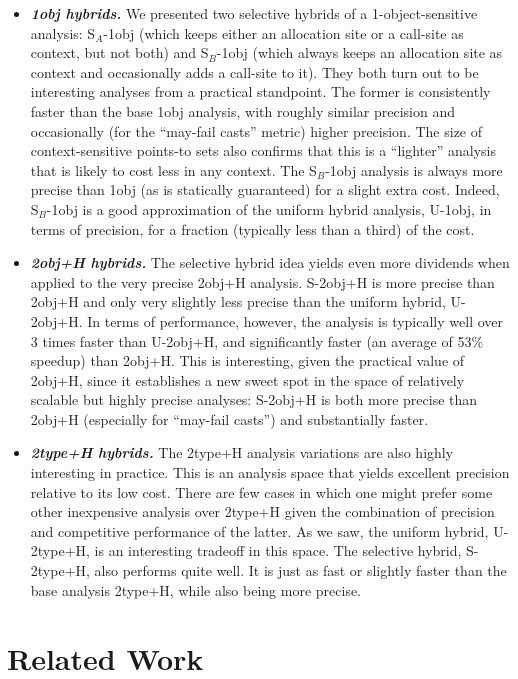 \begin{itemize}
\item \textbf{\emph{1obj hybrids.}}
We presented two selective hybrids of a 1-object-sensitive analysis:
S$_A$-1obj (which keeps either an allocation site or a call-site as
context, but not both) and S$_B$-1obj (which always keeps an
allocation site as context and occasionally adds a call-site to
it). They both turn out to be interesting analyses from a practical
standpoint. The former is consistently faster than the base 1obj
analysis, with roughly similar precision and occasionally (for the
``may-fail casts'' metric) higher precision. The size of
context-sensitive points-to sets also confirms that this is a
``lighter'' analysis that is likely to cost less in any context. The
S$_B$-1obj analysis is always more precise than 1obj (as is statically
guaranteed) for a slight extra cost. Indeed, S$_B$-1obj is a good
approximation of the uniform hybrid analysis, U-1obj, in terms of
precision, for a fraction (typically less than a third) of the cost.

\item \textbf{\emph{2obj+H hybrids.}}  The selective hybrid idea
yields even more dividends when applied to the very precise 2obj+H
analysis. S-2obj+H is more precise than 2obj+H and only very slightly
less precise than the uniform hybrid, U-2obj+H. In terms of
performance, however, the analysis is typically well over 3 times
faster than U-2obj+H, and significantly faster (an average of 53\%
speedup) than 2obj+H. This is interesting, given the practical value
of 2obj+H, since it establishes a new sweet spot in the space of
relatively scalable but highly precise analyses: S-2obj+H is both more
precise than 2obj+H (especially for ``may-fail casts'') and
substantially faster.

\item \textbf{\emph{2type+H hybrids.}} The 2type+H analysis variations
are also highly interesting in practice. This is an analysis space
that yields excellent precision relative to its low cost. There are
few cases in which one might prefer some other inexpensive analysis
over 2type+H given the combination of precision and competitive
performance of the latter. As we saw, the uniform hybrid, U-2type+H,
is an interesting tradeoff in this space. The selective hybrid,
S-2type+H, also performs quite well. It is just as fast or slightly
faster than the base analysis 2type+H, while also being more precise.

\end{itemize}


\section{Related Work}
\label{sec:related}


